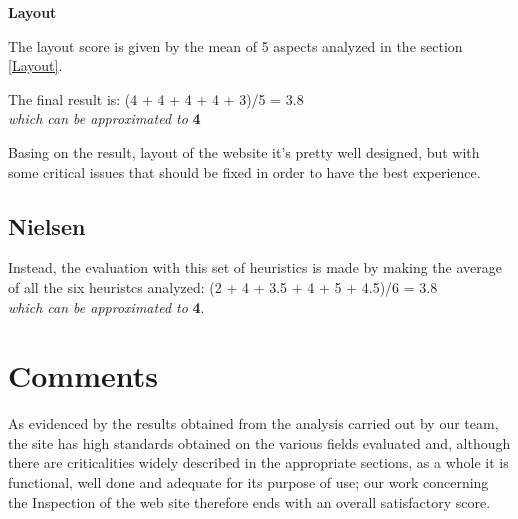 \par\medskip

\textbf{Layout}\par
The layout score is given by the mean of 5 aspects analyzed in the section \ref{Layout}. \par
The final result is: 
(4 + 4 + 4 + 4 + 3)/5 = 3.8 \\
\textit{which can be approximated to} \textbf{4}\par
Basing on the result, layout of the website it's pretty well designed, but with some critical issues that should be fixed in order to have the best experience.

\begin{figure}[H]
  \centering
\end{figure}


\subsection{Nielsen}
Instead, the evaluation with this set of heuristics is made by making the average of all the six heuristcs analyzed:
(2 + 4 + 3.5 + 4 + 5 + 4.5)/6 = 3.8 \\
\textit{which can be approximated to} \textbf{4}.\par

\section{Comments}
As evidenced by the results obtained from the analysis carried out by our team, the site has high standards obtained on the various fields evaluated and, although there are criticalities widely described in the appropriate sections, as a whole it is functional, well done and adequate for its purpose of use; our work concerning the Inspection of the web site therefore ends with an overall satisfactory score.